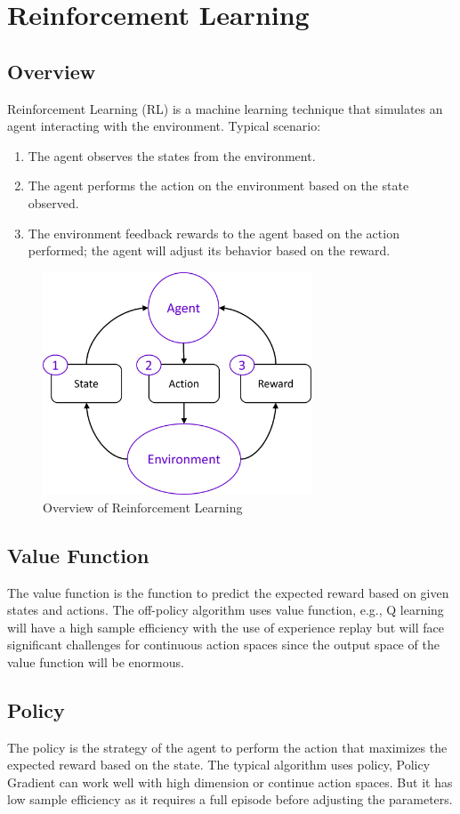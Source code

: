 \chapter{Reinforcement Learning}
\section{Overview}
Reinforcement Learning (RL) is a machine learning technique that simulates an agent interacting with the environment. Typical scenario:
    \begin{enumerate}
        \item The agent observes the states from the environment.
        \item The agent performs the action on the environment based on the state observed.
        \item The environment feedback rewards to the agent based on the action performed; the agent will adjust its behavior based on the reward. 
    \end{enumerate}
\begin{figure}[ht]
  \centering\includegraphics[width=8cm]{images/rl_overview.png}
  \caption [Overview of Reinforcement Learning]
  {Overview of Reinforcement Learning
  }
  \label{fig:rl_overview_diagram}
\end{figure}

\section{Value Function}
The value function is the function to predict the expected reward based on given states and actions. The off-policy algorithm uses value function, e.g., Q learning will have a high sample efficiency with the use of experience replay but will face significant challenges for continuous action spaces since the output space of the value function will be enormous.
\section{Policy}
The policy is the strategy of the agent to perform the action that maximizes the expected reward based on the state.  The typical algorithm uses policy, Policy Gradient can work well with high dimension or continue action spaces. But it has low sample efficiency as it requires a full episode before adjusting the parameters.
